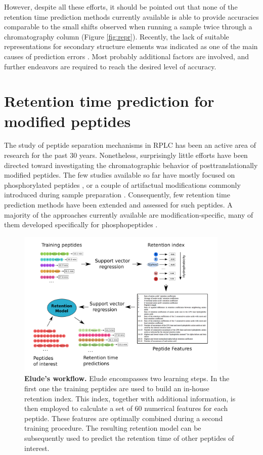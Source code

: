 \documentclass[a4paper]{article}
\begin{document}
However, despite all these efforts, it should be pointed out that none
of the retention time prediction methods currently available is able
to provide accuracies comparable to the small shifts observed when
running a sample twice through a chromatography column
(Figure \ref{fig:repr}). Recently, the lack of suitable
representations for secondary structure elements was indicated as one
of the main causes of prediction errors \cite{Reimer2012}.  Most
probably additional factors are involved, and further endeavors are
required to reach the desired level of accuracy.

\section{\label{sec:rtpredm}Retention time prediction for modified peptides}

The study of peptide separation mechanisms in RPLC has been an active
area of research for the past 30 years. Nonetheless, surprisingly
little efforts have been directed toward investigating the
chromatographic behavior of posttranslationally modified peptides. The
few studies available so far have mostly focused on phosphorylated
peptides \cite{Kim2007}, or a couple of artifactual modifications
commonly introduced during sample
preparation \cite{Reimer2011}. Consequently, few retention time
prediction methods have been extended and assessed for such
peptides. A majority of the approaches currently available are
modification-specific, many of them developed specifically for
phosphopeptides \cite{Kawakami2005, perlova2010}.

\begin{figure}[!h]
\centering 
\includegraphics[width=0.9\textwidth]{img/elude-ptm.pdf}
\caption{\label{fig:elude} {\bf {\sc Elude}'s workflow.}  {\sc Elude} encompasses two learning steps. In the first one the training peptides are used to build an in-house retention index. This index, together with additional information, is then employed to calculate a set of 60 numerical features for each peptide. These features are optimally combined during a second training procedure. The resulting retention model can be subsequently used to predict the retention time of other peptides of interest.}
\end{figure}
\end{document}
